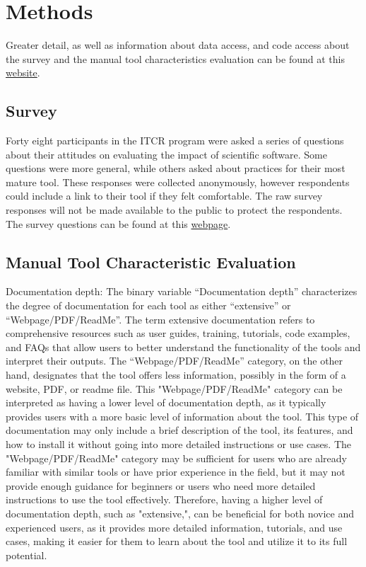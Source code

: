 \documentclass{article}
\begin{document}
\clearpage


\section{Methods}
\label{sec-supp-note-methods}

Greater detail, as well as information about data access, and code access about the survey and the manual tool characteristics evaluation can be found at this \href{https://hutchdatascience.org/ITCR_Metrics_manuscript_website/}{website}.

\subsection{Survey}
\label{sec-supp-note-methods-survey}
Forty eight participants in the ITCR program were asked a series of questions about their attitudes on evaluating the impact of scientific software. Some questions were more general, while others asked about practices for their most mature tool. These responses were collected anonymously, however respondents could include a link to their tool if they felt comfortable. The raw survey responses will not be made available to the public to protect the respondents. The survey questions can be found at this \href{https://hutchdatascience.org/ITCR_Metrics_manuscript_website/questionnaire.html}{webpage}.

\subsection{Manual Tool Characteristic Evaluation}

Documentation depth: The binary variable “Documentation depth” characterizes the degree of documentation for each tool as either “extensive” or “Webpage/PDF/ReadMe”. The term extensive documentation refers to comprehensive resources such as user guides, training, tutorials, code examples, and FAQs that allow users to better understand the functionality of the tools and interpret their outputs. The “Webpage/PDF/ReadMe” category, on the other hand, designates that the tool offers less information, possibly in the form of a website, PDF, or readme file. This "Webpage/PDF/ReadMe" category can be interpreted as having a lower level of documentation depth, as it typically provides users with a more basic level of information about the tool. This type of documentation may only include a brief description of the tool, its features, and how to install it without going into more detailed instructions or use cases. The "Webpage/PDF/ReadMe" category may be sufficient for users who are already familiar with similar tools or have prior experience in the field, but it may not provide enough guidance for beginners or users who need more detailed instructions to use the tool effectively. Therefore, having a higher level of documentation depth, such as "extensive,", can be beneficial for both novice and experienced users, as it provides more detailed information, tutorials, and use cases, making it easier for them to learn about the tool and utilize it to its full potential.
\end{document}
